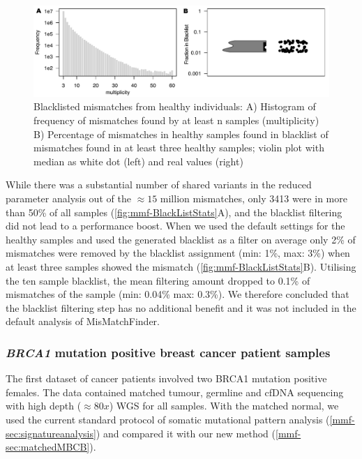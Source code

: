 \begin{figure}[ht]
\centering
\includegraphics[width=.99\linewidth]{Figures/MisMatchFinder/mmfBlackListStats.pdf}
\caption[Blacklisted mismatches from healthy individuals]{Blacklisted mismatches from healthy individuals: A) Histogram of frequency of mismatches found by at least n samples (multiplicity) B) Percentage of mismatches in healthy samples found in blacklist of mismatches found in at least three healthy samples; violin plot with median as white dot (left) and real values (right)}\label{fig:mmf-BlackListStats}
\end{figure}

While there was a substantial number of shared variants in the reduced parameter analysis out of the $\approx 15$ million mismatches, only 3413 were in more than 50\% of all samples (\autoref{fig:mmf-BlackListStats}A), and the blacklist filtering  did not lead to a performance boost. When we used the default settings for the healthy samples and used the generated blacklist as a filter on average only 2\% of mismatches were removed by the blacklist assignment (min: 1\%, max: 3\%) when at least three samples showed the mismatch (\autoref{fig:mmf-BlackListStats}B). Utilising the ten sample blacklist, the mean filtering amount dropped to 0.1\% of mismatches of the sample (min: 0.04\% max: 0.3\%). We therefore concluded that the blacklist filtering step has no additional benefit and it was not included in the default analysis of MisMatchFinder. 

\subsubsection{\textit{BRCA1} mutation positive breast cancer patient samples}
\label{mmf-sec:brcapatients}
The first dataset of cancer patients involved two BRCA1 mutation positive females. The data contained matched tumour, germline and cfDNA sequencing with high depth ($\approx 80x$) WGS for all samples. With the matched normal, we used the current standard protocol of somatic mutational pattern analysis (\autoref{mmf-sec:signatureanalysis}) and compared it with our new method (\autoref{mmf-sec:matchedMBCB}). 

